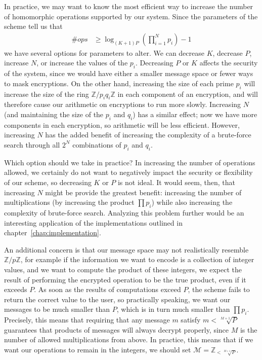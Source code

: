 \documentclass[11pt]{report}
\newcommand{\Z}{\mathbb{Z}}
\newcommand{\M}{\mathcal{M}}
\newcommand{\Zp}{\mathbb{Z}/p\mathbb{Z}}
\begin{document}
In practice, we may want to know the most efficient way to increase the number of homomorphic operations supported by our system. Since the parameters of the scheme tell us that
\begin{align*}
\#ops &\geq \log_{(K+1)P}\left(\prod_{i=1}^N p_i\right)-1
\end{align*}
we have several options for parameters to alter. We can decrease $K$, decrease $P$, increase $N$, or increase the values of the $p_i$. Decreasing $P$ or $K$ affects the security of the system, since we would have either a smaller message space or fewer ways to mask encryptions. On the other hand, increasing the size of each prime $p_i$ will increase the size of the ring $\Z/p_iq_i\Z$ in each component of an encryption, and will therefore cause our arithmetic on encryptions to run more slowly. Increasing $N$ (and maintaining the size of the $p_i$ and $q_i$) has a similar effect; now we have more components in each encryption, so arithmetic will be less efficient. However, increasing $N$ has the added benefit of increasing the complexity of a brute-force search through all $2^N$ combinations of $p_i$ and $q_i$.

Which option should we take in practice? In increasing the number of operations allowed, we certainly do not want to negatively impact the security or flexibility of our scheme, so decreasing $K$ or $P$ is not ideal. It would seem, then, that increasing $N$ might be provide the greatest benefit: increasing the number of multiplications (by increasing the product $\prod p_i$) while also increasing the complexity of brute-force search. Analyzing this problem further would be an interesting application of the implementations outlined in chapter~\ref{chap:implementation}.

An additional concern is that our message space may not realistically resemble $\Zp$, for example if the information we want to encode is a collection of integer values, and we want to compute the product of these integers, we expect the result of performing the encrypted operation to be the true product, even if it exceeds $P$. As soon as the results of computations exceed $P$, the scheme fails to return the correct value to the user, so practically speaking, we want our messages to be much smaller than $P$, which is in turn much smaller than $\prod p_i$. Precisely, this means that requiring that any message $m$ satisfy $m<\sqrt[M+1]{P}$ guarantees that products of messages will always decrypt properly, since $M$ is the number of allowed multiplications from above. In practice, this means that if we want our operations to remain in the integers, we should set $\M = \Z_{<\sqrt[M+1]{P}}$.
\end{document}
